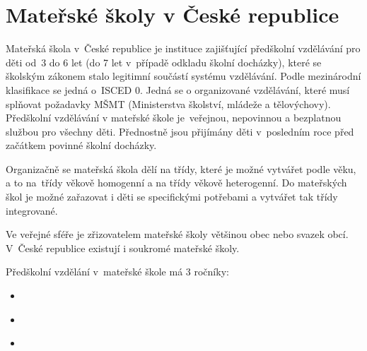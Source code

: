 	\section{Mateřské školy v České republice}
		Mateřská škola v České republice je instituce zajišťující předškolní vzdělávání pro děti od 3 do 6 let (do 7 let v případě odkladu školní docházky), které se školským zákonem stalo legitimní součástí systému vzdělávání. Podle mezinárodní klasifikace se jedná o ISCED 0. Jedná se o organizované vzdělávání, které musí splňovat požadavky MŠMT (Ministerstva školství, mládeže a tělovýchovy). Předškolní vzdělávání v mateřské škole je veřejnou, nepovinnou a bezplatnou službou pro všechny děti. Přednostně jsou přijímány děti v posledním roce před začátkem povinné školní docházky. 

		Organizačně se mateřská škola dělí na třídy, které je možné vytvářet podle věku, a to na třídy věkově homogenní a na třídy věkově heterogenní. Do mateřských škol je možné zařazovat i děti se specifickými potřebami a vytvářet tak třídy integrované. 

		Ve veřejné sféře je zřizovatelem mateřské školy většinou obec nebo svazek obcí. V České republice existují i soukromé mateřské školy.

		Předškolní vzdělání v mateřské škole má 3 ročníky:
		
\begin{itemize}
		\item [] \textit{}
		\item [] \textit{}
		\item [] \textit {}
\end{itemize}
\citep[s.~71]{Organizace}